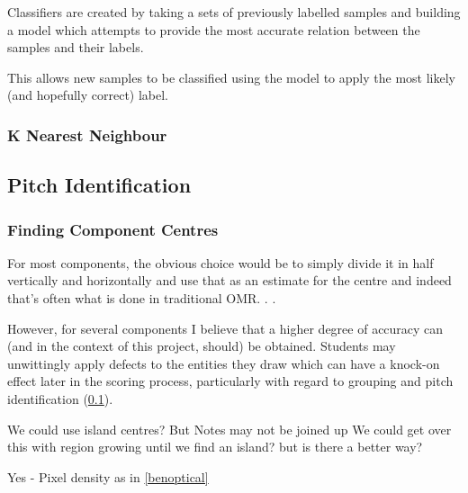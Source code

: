 Classifiers are created by taking a sets of previously labelled samples and building a model which attempts to provide the most accurate relation between the samples and their labels.

This allows new samples to be classified using the model to apply the most likely (and hopefully correct) label.

\subsubsection{K Nearest Neighbour}

\subsection{Pitch Identification}
\label{sec:pitch-identification}

\subsubsection{Finding Component Centres}

For most components, the obvious choice would be to simply divide it in half vertically and horizontally and use that as an estimate for the centre and indeed that's often what is done in traditional OMR. .
.

However, for several components I believe that a higher degree of accuracy can (and in the context of this project, should) be obtained. Students may unwittingly apply defects to the entities they draw which can have a knock-on effect later in the scoring process, particularly with regard to grouping and pitch identification (\cref{sec:pitch-identification}).

We could use island centres? But Notes may not be joined up
We could get over this with region growing until we find an island? but is there a better way?

Yes - Pixel density as in \cref{benoptical}




